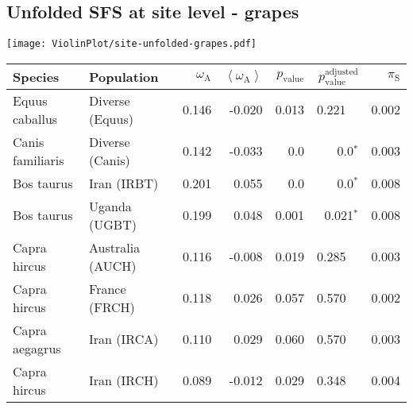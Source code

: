 \subsection{Unfolded SFS at site level - grapes} 
\begin{center}
\texttt{[image: ViolinPlot/site-unfolded-grapes.pdf]} 
\begin{adjustbox}{width = 1\textwidth}
\begin{tabular}{|l|l|r|r|r|r|r|}
\toprule
             Species &                      Population & $\omega_{\mathrm{A}}$ & $\left< \omega_{\mathrm{A}} \right>$ & $p_{\mathrm{value}}$ & $p_{\mathrm{value}}^{\mathrm{adjusted}}$ & $\pi_{\textrm{S}}$ \\
\midrule
      Equus caballus &                 Diverse (Equus) &                 0.146 &                               -0.020 &                0.013 &                                  0.221~~ &              0.002 \\
    Canis familiaris &                 Diverse (Canis) &                 0.142 &                               -0.033 &                  0.0 &                             0.0$\bm{^*}$ &              0.003 \\
          Bos taurus &                     Iran (IRBT) &                 0.201 &                                0.055 &                  0.0 &                             0.0$\bm{^*}$ &              0.008 \\
          Bos taurus &                   Uganda (UGBT) &                 0.199 &                                0.048 &                0.001 &                           0.021$\bm{^*}$ &              0.008 \\
        Capra hircus &                Australia (AUCH) &                 0.116 &                               -0.008 &                0.019 &                                  0.285~~ &              0.003 \\
        Capra hircus &                   France (FRCH) &                 0.118 &                                0.026 &                0.057 &                                  0.570~~ &              0.002 \\
      Capra aegagrus &                     Iran (IRCA) &                 0.110 &                                0.029 &                0.060 &                                  0.570~~ &              0.003 \\
        Capra hircus &                     Iran (IRCH) &                 0.089 &                               -0.012 &                0.029 &                                  0.348~~ &              0.004 \\

\end{tabular}
\end{adjustbox}
\end{center}
